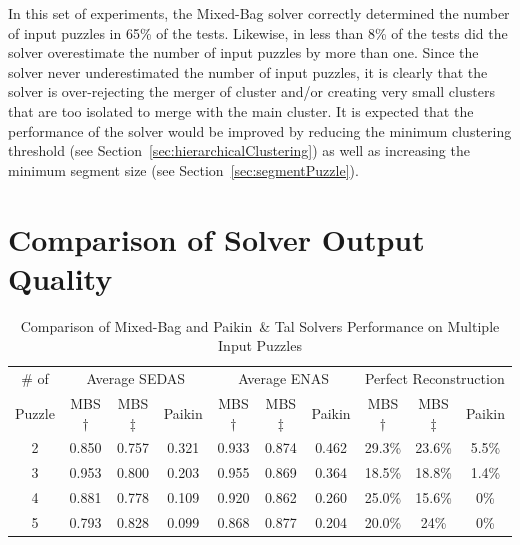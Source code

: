 In this set of experiments, the Mixed-Bag solver correctly determined the number of input puzzles in 65\% of the tests.  Likewise, in less than 8\% of the tests did the solver overestimate the number of input puzzles by more than one.  Since the solver never underestimated the number of input puzzles, it is clearly that the solver is over-rejecting the merger of cluster and/or creating very small clusters that are too isolated to merge with the main cluster.  It is expected that the performance of the solver would be improved by reducing the minimum clustering threshold (see Section~\ref{sec:hierarchicalClustering}) as well as increasing the minimum segment size (see Section~\ref{sec:segmentPuzzle}). 

\section{Comparison of Solver Output Quality}


\begin{table}[tb]
\begin{center}
\begin{tabular}{ c||c|c|c||c|c|c||c|c|c } 
 \toprule
 \# of & \multicolumn{3}{c||}{Average SEDAS} & \multicolumn{3}{c||}{Average ENAS} & \multicolumn{3}{c}{Perfect Reconstruction} \\ \cline{2-10}
 Puzzle & MBS$\dagger$ & MBS$\ddagger$ & Paikin & MBS$\dagger$ & MBS$\ddagger$ & Paikin & MBS$\dagger$ & MBS$\ddagger$ & Paikin \\ 
 \hline \hline
 
	2 & 0.850 & 0.757 & 0.321 & 0.933 & 0.874 & 0.462 & 29.3\% & 23.6\% & 5.5\% \\ \hline
 
	3 & 0.953 & 0.800 & 0.203 & 0.955 & 0.869 & 0.364 & 18.5\% & 18.8\% & 1.4\% \\ \hline
  
	4 & 0.881 & 0.778 & 0.109 & 0.920 & 0.862 & 0.260 & 25.0\% & 15.6\% & 0\% \\ \hline
  
	5 & 0.793 & 0.828 & 0.099 & 0.868 & 0.877 & 0.204 & 20.0\% & 24\% & 0\% \\ 
 \bottomrule
\end{tabular}
\end{center}
\caption{Comparison of Mixed-Bag and Paikin~\& Tal Solvers Performance on Multiple Input Puzzles}\label{tab:tableSolverPerformanceComparison}
\end{table}

